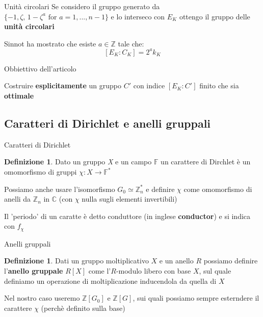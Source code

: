 \documentclass{beamer}
\theoremstyle{plain}
\theoremstyle{remark}
\theoremstyle{definition}
\newtheorem{deff}[teo]{Definizione}
\newcommand{\Z}{\mathbb{Z}}
\newcommand{\F}{\mathbb{F}}
\newcommand{\C}{\mathbb{C}}
\begin{document}
	\begin{frame}{Unità circolari}
		Se considero il gruppo generato da $ \{ -1 ,  \zeta , \, 1 - \zeta ^a \text{ for } a = 1, ... , n-1 \} $ e lo interseco con $ E_K $ ottengo il gruppo delle \textbf{unità circolari}\pause
		\begin{exampleblock}{}
			Sinnot ha mostrato che esiste $ a \in \Z $ tale che:
			\[ [E_K : C_K] = 2^a k_K\]
			\nocite{SIN}
		\end{exampleblock}
	\end{frame}
	
	\begin{frame}{Obbiettivo dell'articolo}
		\begin{alertblock}{}
			 	Costruire \textbf{esplicitamente} un gruppo  $ C' $ con indice $ [ E_K : C' ] $ finito che sia \textbf{ottimale}
		\end{alertblock}
	\end{frame}
	
\subsection{Caratteri di Dirichlet e anelli gruppali}
	
	\begin{frame}{Caratteri di Dirichlet}
		\begin{deff}
			 	Dato un gruppo \textit{X} e un campo $ \F $ un carattere di Dirchlet è un omomorfismo di gruppi $ \chi :X \to \F ^*  $
		 \end{deff}
		 \pause
		 Possiamo anche usare l'isomorfismo $ G_0 \simeq \Z_n ^ *$ e definire $\chi$ come omomorfismo di anelli da $ \Z_n $ in $ \C $ (con $\chi$ nulla sugli elementi invertibili)
		 \pause
		 \begin{exampleblock}{}
		 Il 'periodo' di un caratte è detto conduttore (in inglese \textbf{conductor}) e si indica con $ f_\chi $
		 \end{exampleblock}
	\end{frame}
	
	\begin{frame}{Anelli gruppali}
		\begin{deff}
			Dati un gruppo moltiplicativo $ X $ e un anello $ R $ possiamo definire l'\textbf{anello gruppale} $ R[X] $ come l'$ R $-modulo libero con base $ X $, sul quale definiamo un operazione di moltiplicazione inducendola da quella di $ X $
		\end{deff}
		\pause
		Nel nostro caso useremo $ \Z [G_0] $ e $ \Z [G] $, sui quali possiamo sempre esterndere il carattere $\chi$ (perchè definito sulla base)
	\end{frame}
	
\end{document}
